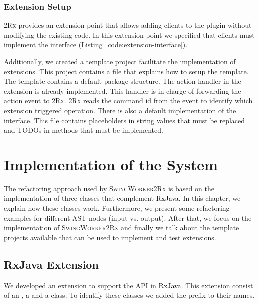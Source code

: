 \documentclass[type=bsc,accentcolor=tud9c]{tudthesis}
\newcommand{\framework}[1]{\textcolor{black}{#1}}
\newcommand{\toolcore}{\textsc{2Rx}}
\newcommand{\toolextension}{\textsc{SwingWorker2Rx}}
\begin{document}
\subsection{Extension Setup}
\toolcore{} provides an extension point that allows adding clients to the plugin without modifying the existing code. In this extension point we specified that clients must implement the interface  (Listing~\ref{code:extension-interface}).



Additionally, we created a template project facilitate the implementation of extensions. This project contains a  file that explains how to setup the template. The template contains a default package structure. The action handler in the extension is already implemented. This handler is in charge of forwarding the action event to \toolcore{}. \toolcore{} reads the command id from the event to identify which extension triggered operation. There is also a default implementation of the  interface. This file contains placeholders in string values that must be replaced and TODOs in methods that must be implemented.

\chapter{Implementation of the System}
\label{chapter:implementation}
The refactoring approach used by \toolextension{} is based on the implementation of three classes that complement \framework{RxJava}. In this chapter, we explain how these classes work. Furthermore, we present some refactoring examples for different AST nodes (input vs. output). After that, we focus on the implementation of \toolextension{} and finally we talk about the template projects available that can be used to implement and test extensions.

\section{RxJava Extension}

We developed an extension to support the  API in \framework{RxJava}. This extension consist of an , a  and a  class. To identify these classes we added the prefix  to their names. 
\end{document}
